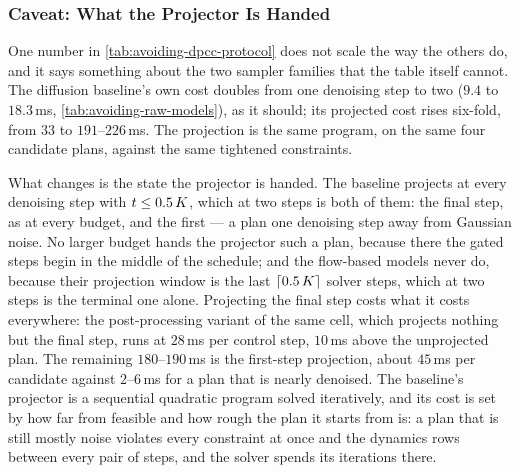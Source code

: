 \subsubsection{Caveat: What the Projector Is Handed}\label{sec:res:avoiding:caveat:noise}

One number in \autoref{tab:avoiding-dpcc-protocol} does not scale the way the others do, and it says
something about the two sampler families that the table itself cannot. The diffusion baseline's own cost
doubles from one denoising step to two ($9.4$ to $18.3$\,ms, \autoref{tab:avoiding-raw-models}), as it
should; its projected cost rises six-fold, from $33$ to $191$--$226$\,ms. The projection is the same
program, on the same four candidate plans, against the same tightened constraints.

What changes is the state the projector is handed. The baseline projects at every denoising step with
$t \le 0.5\,K$, which at two steps is both of them: the final step, as at every budget, and the first
--- a plan one denoising step away from Gaussian noise. No larger budget hands the projector such a plan,
because there the gated steps begin in the middle of the schedule; and the flow-based models never do,
because their projection window is the last $\lceil 0.5\,K \rceil$ solver steps, which at two steps
is the terminal one alone. Projecting the final step costs what it costs everywhere: the post-processing
variant of the same cell, which projects nothing but the final step, runs at $28$\,ms per control step,
$10$\,ms above the unprojected plan. The remaining $180$--$190$\,ms is the first-step projection,
about $45$\,ms per candidate against $2$--$6$\,ms for a plan that is nearly denoised. The baseline's
projector is a sequential quadratic program solved iteratively, and its cost is set by how far from
feasible and how rough the plan it starts from is: a plan that is still mostly noise violates every
constraint at once and the dynamics rows between every pair of steps, and the solver spends its
iterations there.

